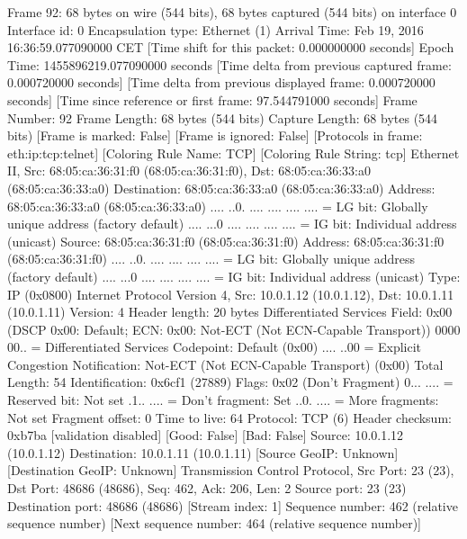 Frame 92: 68 bytes on wire (544 bits), 68 bytes captured (544 bits) on interface 0
    Interface id: 0
    Encapsulation type: Ethernet (1)
    Arrival Time: Feb 19, 2016 16:36:59.077090000 CET
    [Time shift for this packet: 0.000000000 seconds]
    Epoch Time: 1455896219.077090000 seconds
    [Time delta from previous captured frame: 0.000720000 seconds]
    [Time delta from previous displayed frame: 0.000720000 seconds]
    [Time since reference or first frame: 97.544791000 seconds]
    Frame Number: 92
    Frame Length: 68 bytes (544 bits)
    Capture Length: 68 bytes (544 bits)
    [Frame is marked: False]
    [Frame is ignored: False]
    [Protocols in frame: eth:ip:tcp:telnet]
    [Coloring Rule Name: TCP]
    [Coloring Rule String: tcp]
Ethernet II, Src: 68:05:ca:36:31:f0 (68:05:ca:36:31:f0), Dst: 68:05:ca:36:33:a0 (68:05:ca:36:33:a0)
    Destination: 68:05:ca:36:33:a0 (68:05:ca:36:33:a0)
        Address: 68:05:ca:36:33:a0 (68:05:ca:36:33:a0)
        .... ..0. .... .... .... .... = LG bit: Globally unique address (factory default)
        .... ...0 .... .... .... .... = IG bit: Individual address (unicast)
    Source: 68:05:ca:36:31:f0 (68:05:ca:36:31:f0)
        Address: 68:05:ca:36:31:f0 (68:05:ca:36:31:f0)
        .... ..0. .... .... .... .... = LG bit: Globally unique address (factory default)
        .... ...0 .... .... .... .... = IG bit: Individual address (unicast)
    Type: IP (0x0800)
Internet Protocol Version 4, Src: 10.0.1.12 (10.0.1.12), Dst: 10.0.1.11 (10.0.1.11)
    Version: 4
    Header length: 20 bytes
    Differentiated Services Field: 0x00 (DSCP 0x00: Default; ECN: 0x00: Not-ECT (Not ECN-Capable Transport))
        0000 00.. = Differentiated Services Codepoint: Default (0x00)
        .... ..00 = Explicit Congestion Notification: Not-ECT (Not ECN-Capable Transport) (0x00)
    Total Length: 54
    Identification: 0x6cf1 (27889)
    Flags: 0x02 (Don't Fragment)
        0... .... = Reserved bit: Not set
        .1.. .... = Don't fragment: Set
        ..0. .... = More fragments: Not set
    Fragment offset: 0
    Time to live: 64
    Protocol: TCP (6)
    Header checksum: 0xb7ba [validation disabled]
        [Good: False]
        [Bad: False]
    Source: 10.0.1.12 (10.0.1.12)
    Destination: 10.0.1.11 (10.0.1.11)
    [Source GeoIP: Unknown]
    [Destination GeoIP: Unknown]
Transmission Control Protocol, Src Port: 23 (23), Dst Port: 48686 (48686), Seq: 462, Ack: 206, Len: 2
    Source port: 23 (23)
    Destination port: 48686 (48686)
    [Stream index: 1]
    Sequence number: 462    (relative sequence number)
    [Next sequence number: 464    (relative sequence number)]
